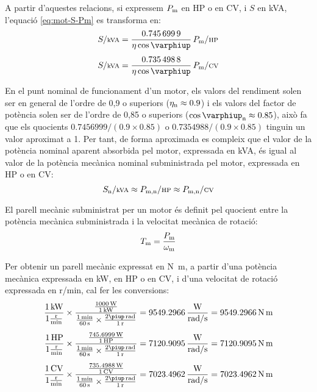  A partir d'aquestes relacions, si expressem $P_\mathrm{m}$  en HP o en CV, i $S$  en kVA, l'equació \eqref{eq:mot-S-Pm} es transforma en:
\begin{align}
    S/{\scriptstyle\unit{kVA}} &= \frac{\num{0,7456999}}{\eta \cos\varphiup}\,   P\ped{m}/{\scriptstyle\unit{HP}} \\[1ex]
    S/{\scriptstyle\unit{kVA}} &= \frac{\num{0,7354988}}{\eta \cos\varphiup}\,   P\ped{m}/{\scriptstyle\unit{CV}}
\end{align}

En el punt nominal de funcionament d'un motor, els valors del rendiment solen ser en general de l'ordre de 0,9 o superiors ($\eta_\mathrm{n} \approx \num{0,9}$) i els valors del factor de potència solen ser de l'ordre de 0,85 o superiors ($\cos\varphiup\ped{n} \approx \num{0,85}$), això fa que els quocients $\num{0,7456999}/(\num{0,9} \times \num{0,85})$ o $\num{0,7354988}/(\num{0,9} \times \num{0,85})$ tinguin un valor aproximat a 1. Per tant, de forma aproximada es compleix que el valor de la potència nominal aparent absorbida pel motor, expressada en kVA, és igual al valor de la potència mecànica nominal subministrada pel motor, expressada en HP o en CV:
\begin{equation}\label{eq:kVA-CV-HP}
    S\ped{n}/{\scriptstyle \unit{kVA}} \approx  P\ped{m,n}/{\scriptstyle \unit{HP}} \approx  P\ped{m,n}/{\scriptstyle \unit{CV}}
\end{equation}


El parell mecànic subministrat per un motor és definit pel quocient entre la potència mecànica subministrada i la velocitat mecànica de rotació:
\begin{equation}\index{parell!mecànic}
    T\ped{m} = \frac{P\ped{m}}{\omega\ped{m}}\label{eq:T-P-w}
\end{equation}

Per  obtenir un  parell mecànic expressat en \unit{N.m}, a partir d'una potència mecànica expressada en kW, en HP o en CV, i d'una velocitat de rotació expressada en \unit{r/min}, cal  fer les conversions:
\begin{subequations}
\begin{align}
	\frac{\qty{1}{kW}}{1\frac{\unit{r}}{\unit{min}}} \times
    \frac{\frac{\qty{1000}{W}}{\qty{1}{kW}}}{ \frac{\qty{1}{min}}{\qty{60}{s}} \times \frac{2\piup\,\unit{rad}}{\qty{1}{r}}} &=  \num{9549,2966}\, \frac{\unit{W}}{\unit{rad/s}} = \qty{9549,2966}{N.m} \\[1ex]
    \frac{\qty{1}{HP}}{1\frac{\unit{r}}{\unit{min}}} \times
    \frac{\frac{\qty{745,6999}{W}}{\qty{1}{HP}}}{ \frac{\qty{1}{min}}{\qty{60}{s}} \times \frac{2\piup\,\unit{rad}}{\qty{1}{r}}} &=  \num{7120,9095}\, \frac{\unit{W}}{\unit{rad/s}} = \qty{7120,9095}{N.m} \\[1ex]
    \frac{\qty{1}{CV}}{1\frac{\unit{r}}{\unit{min}}} \times
    \frac{\frac{\qty{735,4988}{W}}{\qty{1}{CV}}}{ \frac{\qty{1}{min}}{\qty{60}{s}} \times \frac{2\piup\,\unit{rad}}{\qty{1}{r}}} &=  \num{7023,4962}\, \frac{\unit{W}}{\unit{rad/s}} = \qty{7023,4962}{N.m}
\end{align}
\end{subequations}

